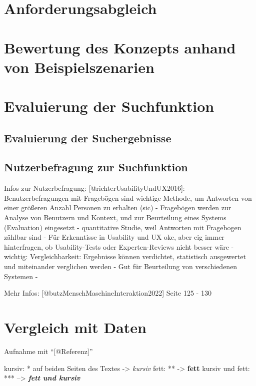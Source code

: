 \documentclass[
  12pt,
  a4paperpaper,
]{report}
\begin{document}
\section{Anforderungsabgleich}\label{anforderungsabgleich}

\section{Bewertung des Konzepts anhand von
Beispielszenarien}\label{bewertung-des-konzepts-anhand-von-beispielszenarien}

\section{Evaluierung der
Suchfunktion}\label{evaluierung-der-suchfunktion}

\subsection{Evaluierung der
Suchergebnisse}\label{evaluierung-der-suchergebnisse}

\subsection{Nutzerbefragung zur
Suchfunktion}\label{nutzerbefragung-zur-suchfunktion}

Infos zur Nutzerbefragung: {[}@richterUsabilityUndUX2016{]}: -
Benutzerbefragungen mit Fragebögen sind wichtige Methode, um Antworten
von einer größeren Anzahl Personen zu erhalten (sic) - Fragebögen werden
zur Analyse von Benutzern und Kontext, und zur Beurteilung eines Systems
(Evaluation) eingesetzt - quantitative Studie, weil Antworten mit
Fragebogen zählbar sind - Für Erkenntisse in Usability und UX oke, aber
eig immer hinterfragen, ob Usability-Tests oder Experten-Reviews nicht
besser wäre - wichtig: Vergleichbarkeit: Ergebnisse können verdichtet,
statistisch ausgewertet und miteinander verglichen werden - Gut für
Beurteilung von verschiedenen Systemen -

Mehr Infos: {[}@butzMenschMaschineInteraktion2022{]} Seite 125 - 130

\section{Vergleich mit Daten}\label{vergleich-mit-daten}

Aufnahme mit ``{[}@Referenz{]}''

kursiv: * auf beiden Seiten des Textes -\textgreater{} \emph{kursiv}
fett: ** -\textgreater{} \textbf{fett} kursiv und fett: ***
--\textgreater{} \textbf{\emph{fett und kursiv}}
\end{document}

